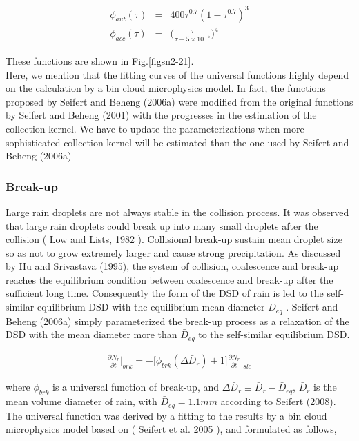 \begin{eqnarray}
\phi_{aut}(\tau)&=&400\tau^{0.7}(1-\tau^{0.7})^{3}\label{152}\\
\phi_{acc}(\tau)&=&\bigl(\frac{\tau}{\tau+5\times 10^{-5}}\bigr)^{4}\label{153}
\end{eqnarray}

These functions are shown in Fig.\ref{figsn2-21}.\\
Here, we mention that the fitting curves of the universal functions highly depend on the calculation by a bin cloud microphysics model. In fact, the functions proposed by Seifert and Beheng (2006a) were modified from the original functions by Seifert and Beheng (2001) with the progresses in the estimation of the collection kernel. We have to update the parameterizations when more sophisticated collection kernel will be estimated than the one used by Seifert and Beheng (2006a)

\subsubsection{Break-up}
Large rain droplets are not always stable in the collision process. It was observed that large rain droplets could break up into many small droplets after the collision ( Low and Lists, 1982 ). Collisional break-up sustain mean droplet size so as not to grow extremely larger and cause strong precipitation. As discussed by Hu and Srivastava (1995), the system of collision, coalescence and break-up reaches the equilibrium condition between coalescence and break-up after the sufficient long time. Consequently the form of the DSD of rain is led to the self-similar equilibrium DSD with the equilibrium mean diameter $\bar{D}_{eq}$ . Seifert and Beheng (2006a) simply parameterized the break-up process as a relaxation of the DSD with the mean diameter more than $\bar{D}_{eq}$ to the self-similar equilibrium DSD.

\begin{eqnarray}
\frac{\partial N_{r}}{\partial t}\Bigr|_{brk}=-\bigl[\phi_{brk}(\Delta \bar{D}_{r})+1\bigr]\frac{\partial N_{r}}{\partial t}\Bigr|_{slc}\label{sn154}
\end{eqnarray}

where $\phi_{brk}$ is a universal function of break-up, and $\Delta \bar{D}_{r}\equiv \bar{D}_{r}-\bar{D}_{eq}$, $\bar{D}_{r}$ is the mean volume diameter of rain, with $\bar{D}_{eq} = 1.1 mm$ according to Seifert (2008). The universal function was derived by a fitting to the results by a bin cloud microphysics model based on ( Seifert et al. 2005 ), and formulated as follows,


